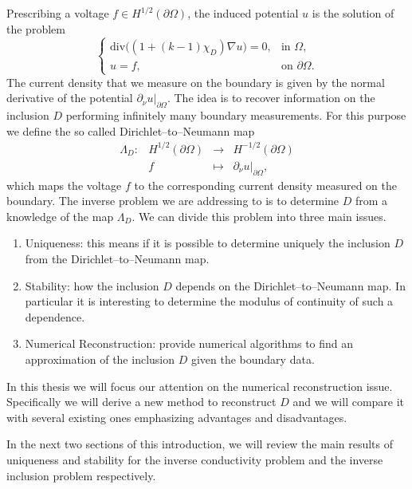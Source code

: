 \documentclass[10pt, a4paper, twoside, openright]{book}
\theoremstyle{definition}
\theoremstyle{plain}
\theoremstyle{plain}
\theoremstyle{plain}
\theoremstyle{plain}
\theoremstyle{plain}
\theoremstyle{plain}
\theoremstyle{plain}
\theoremstyle{plain}
\begin{document}
Prescribing a voltage $f\in H^{1/2}(\partial\Omega)$, the induced potential $u$ is the solution of the problem
$$\left\{\begin{array}{ll}
\mathrm{div}\big((1+(k-1)\chi_D)\nabla u\big)=0, & \textrm{in }\Omega,\\
u=f, & \textrm{on }\partial\Omega.
\end{array}\right.$$
The current density that we measure on the boundary is given by the normal derivative of the potential
$\partial_\nu u|_{\partial\Omega}$. The idea is to recover information on the inclusion $D$ performing infinitely many
boundary measurements. For this purpose we define the so called Dirichlet--to--Neumann map
$$\begin{array}{crcl}
\Lambda_D : & H^{1/2}(\partial\Omega) & \longrightarrow & H^{-1/2}(\partial\Omega)\\
            &   f                     & \longmapsto & \partial_\nu u|_{\partial\Omega},
\end{array}$$
which maps the voltage $f$ to the corresponding current density measured on the boundary.
The inverse problem we are addressing to is to determine $D$ from a knowledge of the map $\Lambda_D$.
We can divide this problem into three main issues.
\begin{enumerate}
\item Uniqueness: this means if it is possible to determine uniquely the inclusion $D$ from the Dirichlet--to--Neumann map.
\item Stability: how the inclusion $D$ depends on the Dirichlet--to--Neumann map. In particular it is interesting
to determine the modulus of continuity of such a dependence.
\item Numerical Reconstruction: provide numerical algorithms to find an approximation of the inclusion $D$ given the boundary data.
\end{enumerate}
In this thesis we will focus our attention on the numerical reconstruction issue.
Specifically we will derive a new method to reconstruct $D$ and we will compare it with several existing ones
emphasizing advantages and disadvantages.

In the next two sections of this introduction, we will review the main results of uniqueness and stability
for the inverse conductivity problem and the inverse inclusion problem respectively.


\end{document}
